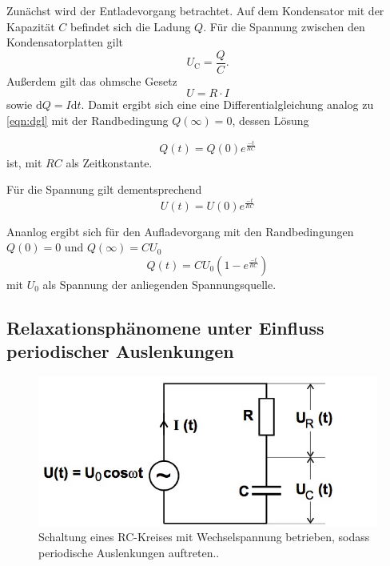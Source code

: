 Zunächst wird der Entladevorgang betrachtet. Auf dem Kondensator mit der Kapazität $C$ befindet sich die Ladung $Q$. Für die Spannung zwischen den Kondensatorplatten gilt
\begin{equation}
  U_{\mathrm C} = \frac{Q}{C} .
\end{equation}
Außerdem gilt das ohmsche Gesetz
\begin{equation}
  U = R \cdot I
\end{equation}
sowie $\mathrm{d}Q = I \mathrm{d}t$.  Damit ergibt sich eine eine Differentialgleichung analog zu \ref{eqn:dgl} mit der Randbedingung $Q(\infty)  = 0$, dessen Lösung

\begin{equation}
  Q(t) = Q(0) e^{\frac{-t}{RC}}
\end{equation}
ist, mit $RC$ als Zeitkonstante.

Für die Spannung gilt dementsprechend
\begin{equation}
  \label{a}
  U(t) = U(0) e^{\frac{-t}{RC}}
\end{equation}

Ananlog ergibt sich für den Aufladevorgang mit den Randbedingungen $Q(0) = 0$ und $Q(\infty) = CU_0$
\begin{equation}
  Q(t) = CU_0(1 - e^{\frac{-t}{RC}})
\end{equation}
mit $U_0$ als Spannung der anliegenden Spannungsquelle.

\subsection{Relaxationsphänomene unter Einfluss periodischer Auslenkungen}

\begin{figure}
  \centering
  \includegraphics[scale=0.5]{content/RC-periodisch.jpg}
  \caption{Schaltung eines RC-Kreises mit Wechselspannung betrieben, sodass periodische Auslenkungen auftreten.\cite{anleitung353}.}
  \label{fig:rc-periodisch}
\end{figure}

